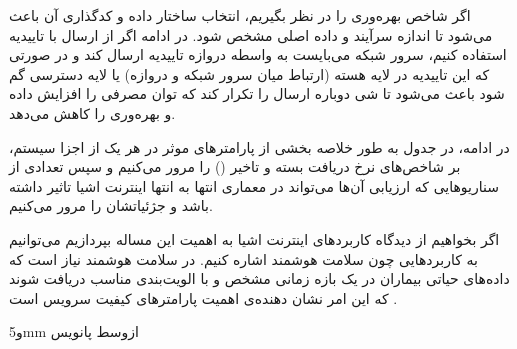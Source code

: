 اگر شاخص بهره‌وری را در نظر بگیریم، انتخاب ساختار داده و کدگذاری آن باعث می‌شود تا اندازه سرآیند و داده اصلی مشخص شود.
در ادامه اگر از ارسال با تاییدیه استفاده کنیم، سرور شبکه می‌بایست به واسطه دروازه تاییدیه ارسال کند و در صورتی
که این تاییدیه در لایه هسته (ارتباط میان سرور شبکه و دروازه) یا لایه دسترسی گم شود باعث می‌شود تا شی
دوباره ارسال را تکرار کند که توان مصرفی را افزایش داده و بهره‌وری را کاهش می‌دهد.

در ادامه، در جدول 
به طور خلاصه بخشی از پارامترهای موثر در هر یک از اجزا سیستم،
بر شاخص‌های نرخ دریافت بسته و تاخیر () را مرور می‌کنیم
و سپس تعدادی از سناریوهایی که ارزیابی آن‌ها می‌تواند در معماری انتها به انتها اینترنت اشیا تاثیر داشته باشد و جژئیاتشان را مرور می‌کنیم.

اگر بخواهیم از دیدگاه کاربردهای اینترنت اشیا به اهمیت این مساله بپردازیم می‌توانیم به کاربردهایی چون سلامت هوشمند اشاره کنیم.
در سلامت هوشمند نیاز است که داده‌های حیاتی بیماران در یک بازه زمانی مشخص و با الویت‌بندی مناسب دریافت شوند که این امر
نشان دهنده‌ی اهمیت پارامترهای کیفیت سرویس است .


‌و{5mm}
‌ازوسط
‌پانویس


